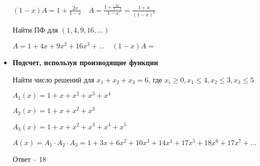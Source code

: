 \documentclass[12pt]{article}
\begin{document}
\begin{itemize}
        $(1 - x)A = 1 + \frac{2x}{1 - x} \quad A = \frac{1 + \frac{2x}{1 - x}}{1 - x} = \frac{1 + x}{(1 - x)^2}$

        \Ex Найти ПФ для $(1, 4, 9, 16, \dots)$

        $A = 1 + 4x + 9x^2 + 16x^3 + \dots \quad (1 - x)A = $

        \item \textbf{Подсчет, используя производящие функции}

        Найти число решений для $x_1 + x_2 + x_3 = 6$, где $x_i \geq 0, x_1 \leq 4, x_2 \leq 3, x_3 \leq 5$

        $A_1(x) = 1 + x + x^2 + x^3 + x^4$

        $A_2(x) = 1 + x + x^2 + x^3$

        $A_3(x) = 1 + x + x^2 + x^3 + x^4 + x^5$

        $A(x) = A_1 \cdot A_2 \cdot A_3 = 1 + 3x + 6x^2 + 10x^3 + 14x^4 + 17x^5 + \underline{18x^6} + 17x^7 + \dots$

        Ответ -- 18

    \end{itemize}
\end{document}
